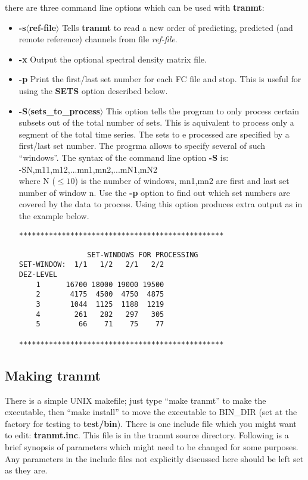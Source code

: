 there are three command line options which can be used with {\bf
tranmt}:
\begin{itemize}
\item {\bf -s$\langle$ref-file$\rangle$} Tells {\bf tranmt} to read a new order of
predicting, predicted (and remote reference) channels from file {\it
ref-file}.
\item {\bf -x} Output the optional spectral density matrix file.
\item {\bf -p} Print the first/last set number for each FC file and
stop. This is useful for using the {\bf SETS} option described below.
\item {\bf -S$\langle$sets\_to\_process$\rangle$} This option tells
the program to only 
process certain subsets out of the total number of sets. This is
aquivalent to process only a segment of the total time series. The
sets to e processed are specified by a first/last set number. The
progrma allows to specify several of such ``windows''. The syntax of
the command line option {\bf -S} is: \\
-SN,m11,m12,...mn1,mn2,...mN1,mN2 \\ 
where N ($ \le 10$) is the number of windows, mn1,mn2 are first and last set
number of window n. Use the {\bf -p} option to find out which set
numbers are covered by the data to process. Using this option produces
extra output as in the example below.

\begin{verbatim}
************************************************
 
                SET-WINDOWS FOR PROCESSING 
SET-WINDOW:  1/1   1/2   2/1   2/2
DEZ-LEVEL
    1      16700 18000 19000 19500
    2       4175  4500  4750  4875
    3       1044  1125  1188  1219
    4        261   282   297   305
    5         66    71    75    77
 
************************************************
\end{verbatim} 
\normalsize
\end{itemize}

\subsection{Making tranmt}

There is a simple UNIX makefile; just type ``make tranmt''
to make the executable, then ``make install'' to move
the executable to BIN\_DIR (set at the factory for testing to
{\bf test/bin}).   There is one include file
which you might want to edit: {\bf tranmt.inc}. 
This file is in the tranmt source directory.
Following is a brief synopsis of parameters which might need to be changed
for some purposes.
Any parameters in the include
files not explicitly discussed here should be left set as they are.

